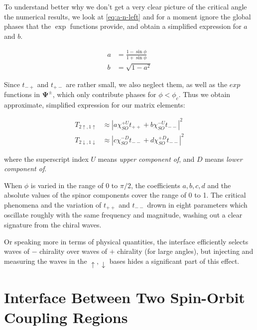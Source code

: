 To understand better why we don't get a very clear picture of the critical
angle the numerical results, we look at \ref{eq:a-n-left} and for a moment
ignore the global phases that the $\exp$ functions provide, and obtain a
simplified expression for $a$ and $b$.

\begin{align}
   a &= \frac{1-\sin \phi}{1 + \sin\phi} \nonumber\\
   b &= \sqrt{1-a^2}
\end{align}

Since $t_{-+}$ and $t_{+-}$ are rather small, we also neglect them, as well as
the $exp$ functions in $\mathbf{\Psi^\pm}$, which only contribute phases for
$\phi < \phi_c$. Thus we obtain approximate, 
simplified expression for our matrix elements:

\begin{align}
    T_{2\uparrow,1\uparrow}     &\approx \left|a \chi_{SO}^{+U} t_{++}
            + b \chi_{SO}^{-U} t_{--} \right|^2\\
    T_{2\downarrow,1\downarrow} &\approx \left|c \chi_{SO}^{-D} t_{--}
            + d \chi_{SO}^{+D} t_{--} \right|^2
\end{align}

where the superscript index $U$ means \emph{upper component of}, and $D$ means
\emph{lower component of}.

When $\phi$ is varied in the range of 0 to $\pi/2$, the coefficients $a, b, c,
d$ and the absolute values of the spinor components cover the range of 0 to 1.
The critical phenomena and the variation of $t_{++}$ and $t_{--}$ drown in
eight parameters which oscillate roughly with the same frequency and
magnitude, washing out a clear signature from the chiral waves.

Or speaking more in terms of physical quantities, the interface efficiently
selects waves of $-$ chirality over waves of $+$ chirality (for large angles),
but injecting and measuring the waves in the $\uparrow,\downarrow$ bases
hides a significant part of this effect.

\section{Interface Between Two Spin-Orbit Coupling Regions}

